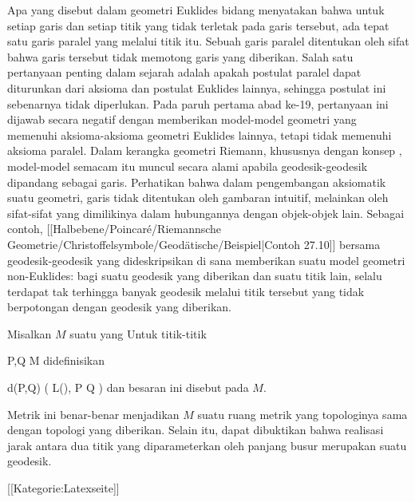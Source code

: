 {}
{

Apa yang disebut  {}
 {} {}
dalam geometri Euklides bidang menyatakan bahwa untuk setiap garis dan setiap titik yang tidak terletak pada garis tersebut, ada tepat satu garis paralel yang melalui titik itu. Sebuah garis paralel ditentukan oleh sifat bahwa garis tersebut tidak memotong garis yang diberikan. Salah satu pertanyaan penting dalam sejarah adalah apakah postulat paralel dapat diturunkan dari aksioma dan postulat Euklides lainnya, sehingga postulat ini sebenarnya tidak diperlukan. Pada paruh pertama abad ke-19, pertanyaan ini dijawab secara negatif dengan memberikan model-model geometri
 {} {}
yang memenuhi aksioma-aksioma geometri Euklides lainnya, tetapi tidak memenuhi aksioma paralel. Dalam kerangka geometri Riemann, khususnya dengan konsep
,
model-model semacam itu muncul secara alami apabila geodesik-geodesik
 {} {}
dipandang sebagai garis. Perhatikan bahwa dalam pengembangan aksiomatik suatu geometri, garis tidak ditentukan oleh gambaran intuitif, melainkan oleh sifat-sifat yang dimilikinya dalam hubungannya dengan objek-objek lain. Sebagai contoh,
[[Halbebene/Poincaré/Riemannsche Geometrie/Christoffelsymbole/Geodätische/Beispiel|Contoh 27.10]]
bersama geodesik-geodesik yang dideskripsikan di sana memberikan suatu model geometri non-Euklides: bagi suatu geodesik yang diberikan dan suatu titik lain, selalu terdapat tak terhingga banyak geodesik melalui titik tersebut yang tidak berpotongan dengan geodesik yang diberikan.

}

{}
{

Misalkan $M$ suatu
yang
Untuk titik-titik

\mavergleichskette
{\vergleichskette
{ P,Q
}
{ \in }{ M
}
{  }{
}
{    }{
}
{   }{
}
}
{}{}{}
didefinisikan

\mavergleichskettedisp
{\vergleichskette
{ d(P,Q)
}
{ } {  ( L(\gamma), \gamma {} P  Q  )
}
{ } {
}
{ } {
}
{ } {
}
}
{}{}{}
dan besaran ini disebut
pada $M$.

}

Metrik ini benar-benar menjadikan $M$ suatu ruang metrik yang topologinya sama dengan topologi yang diberikan. Selain itu, dapat dibuktikan bahwa realisasi jarak antara dua titik yang diparameterkan oleh panjang busur merupakan suatu geodesik.

 [[Kategorie:Latexseite]]
